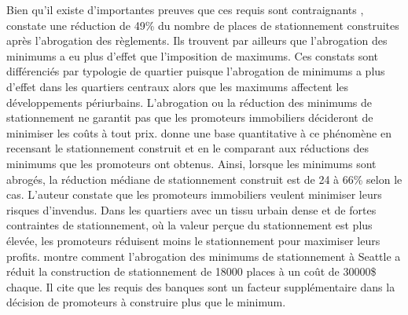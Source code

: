     Bien qu'il existe d'importantes preuves que ces requis sont contraignants \parencite{cutter_iv_parking_2010,willson_suburban_1995}, \textcite{li_parking_2014} constate une réduction de 49\% du nombre de places de stationnement construites après l'abrogation des règlements. Ils trouvent par ailleurs que l'abrogation des minimums a eu plus d'effet que l'imposition de maximums. Ces constats sont différenciés par typologie de quartier puisque l'abrogation de minimums a plus d'effet dans les quartiers centraux alors que les maximums affectent les développements périurbains. L'abrogation ou la réduction des minimums de stationnement ne garantit pas que les promoteurs immobiliers décideront de minimiser les coûts à tout prix. \textcite{stangl_parking_2019} donne une base quantitative à ce phénomène en recensant le stationnement construit et en le comparant aux réductions des minimums que les promoteurs ont obtenus. Ainsi, lorsque les minimums sont abrogés, la réduction médiane de stationnement construit est de 24 à 66\% selon le cas. L'auteur constate que les promoteurs immobiliers veulent minimiser leurs risques d'invendus. Dans les quartiers avec un tissu urbain dense et de fortes contraintes de stationnement, où la valeur perçue du stationnement est plus élevée, les promoteurs réduisent moins le stationnement pour maximiser leurs profits. \textcite{gabbe_parking_2020} montre comment l'abrogation des minimums de stationnement à Seattle a réduit la construction de stationnement de 18000 places à un coût de 30000\$ chaque. Il cite que les requis des banques sont un facteur supplémentaire dans la décision de promoteurs à construire plus que le minimum.   \par